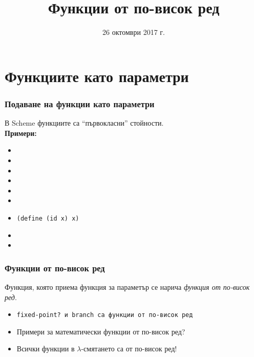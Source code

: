 \documentclass{beamer}
\title{Функции от по-висок ред}
\date{26 октомври 2017 г.}
\begin{document}
\begin{frame}
  \titlepage
\end{frame}

\section{Функциите като параметри}

\begin{frame}[fragile]
  \frametitle{Подаване на функции като параметри}

  В Scheme функциите са ``първокласни'' стойности.\\[1em]
  \pause
  \textbf{Примери:}
  \begin{itemize}[<+->]
  \item {}
  \item {}
  \item {}
  \item {}
  \item {}
    {}
  \item {}
  \item \verb#(define (id x) x)#
  \item {}
  \item {}
  \end{itemize}
\end{frame}

\begin{frame}
  \frametitle{Функции от по-висок ред}

  \begin{definition}
    Функция, която приема функция за параметър се нарича \emph{функция от по-висок ред}.
  \end{definition}
  \pause
  \begin{itemize}[<+->]
  \item \tt{fixed-point?} и \tt{branch} са функции от по-висок ред
  \item \alert{Примери за математически функции от по-висок ред?}
  \item Всички функции в $\lambda$-смятането са от по-висок ред!
  \end{itemize}
\end{frame}
\end{document}
